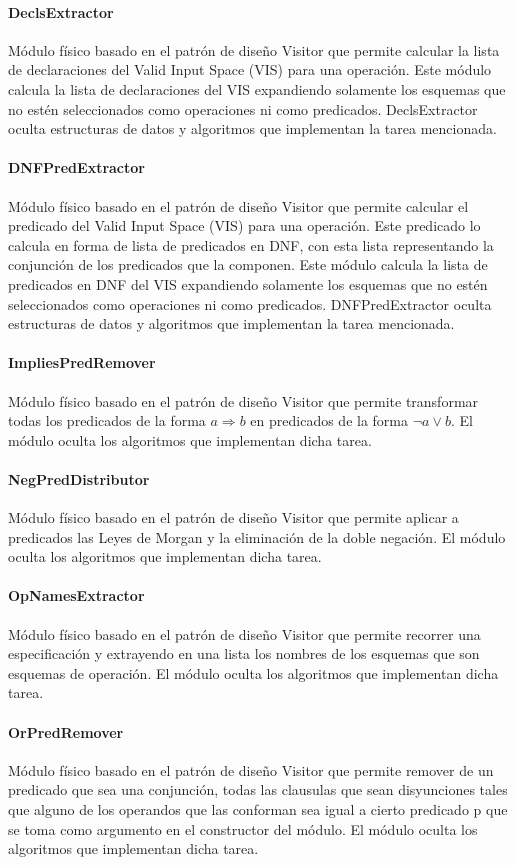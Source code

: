 \documentclass[a4paper,10pt]{report}
\begin{document}
				\paragraph{DeclsExtractor}
				Módulo físico basado en el patrón de diseño Visitor que permite calcular la lista de declaraciones del Valid Input Space (VIS) para una operación.  Este módulo calcula la lista de declaraciones del VIS expandiendo solamente los esquemas que no estén seleccionados como operaciones ni como predicados. DeclsExtractor oculta estructuras de datos y algoritmos que implementan la tarea mencionada.				
				\paragraph{DNFPredExtractor}
				Módulo físico basado en el patrón de diseño Visitor que permite calcular el predicado del Valid Input Space (VIS) para una operación. Este predicado lo calcula en forma de lista de predicados en DNF, con esta lista representando la conjunción de los predicados que la componen. Este módulo calcula la lista de predicados en DNF del VIS expandiendo solamente los esquemas que no estén seleccionados como operaciones ni como predicados. DNFPredExtractor oculta estructuras de datos y algoritmos que implementan la tarea mencionada.				
				\paragraph{ImpliesPredRemover}
				Módulo físico basado en el patrón de diseño Visitor que permite transformar todas los predicados de la forma $a \Rightarrow b$ en predicados de la forma $\lnot a \lor b$. El módulo oculta los algoritmos que implementan dicha tarea.
				\paragraph{NegPredDistributor}
				Módulo físico basado en el patrón de diseño Visitor que permite aplicar a predicados las Leyes de Morgan y la eliminación de la doble negación. El módulo oculta los algoritmos que implementan dicha tarea.
				\paragraph{OpNamesExtractor}
				Módulo físico basado en el patrón de diseño Visitor que permite recorrer una especificación y extrayendo en una lista los nombres de los esquemas que son esquemas de operación.  El módulo oculta los algoritmos que implementan dicha tarea.			
				\paragraph{OrPredRemover}
				Módulo físico basado en el patrón de diseño Visitor que permite remover de un predicado que sea una conjunción, todas las clausulas que sean disyunciones tales que alguno de los operandos que las conforman sea igual a cierto predicado p que se toma como argumento en el constructor del módulo. El módulo oculta los algoritmos que implementan dicha tarea.
\end{document}
